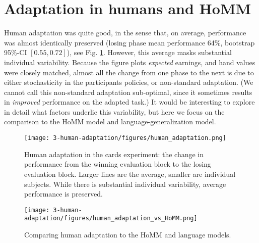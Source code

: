 \section{Adaptation in humans and HoMM}
Human adaptation was quite good, in the sense that, on average, performance was almost identically preserved (losing phase mean performance 64\%, bootstrap 95\%-CI \([0.55, 0.72]\)), see Fig. \ref{fig:human_cards_adaptation_results}. However, this average masks substantial individual variability. Because the figure plots \emph{expected} earnings, and hand values were closely matched, almost all the change from one phase to the next is due to either stochasticity in the participants policies, or non-standard adaptation. (We cannot call this non-standard adaptation sub-optimal, since it sometimes results in \emph{improved} performance on the adapted task.) It would be interesting to explore in detail what factors underlie this variability, but here we focus on the comparison to the HoMM model and language-generalization model. \par  
\begin{figure}
\centering
\texttt{[image: 3-human-adaptation/figures/human\_adaptation.png]}
\caption[Human adaptation in the cards experiment.]{Human adaptation in the cards experiment: the change in performance from the winning evaluation block to the losing evaluation block. Larger lines are the average, smaller are individual subjects. While there is substantial individual variability, average performance is preserved.} \label{fig:human_cards_adaptation_results}
\end{figure}

\begin{figure}
\centering
\texttt{[image: 3-human-adaptation/figures/human\_adaptation\_vs\_HoMM.png]}
\caption{Comparing human adaptation to the HoMM and language models.}\label{fig:human_cards_homm_results}
\end{figure}

